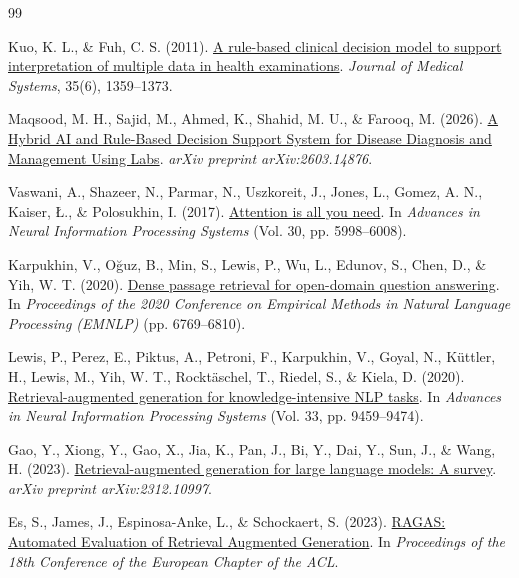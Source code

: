 \cleardoublepage
{}
{}

\begin{thebibliography}{99}

Kuo, K. L., \& Fuh, C. S. (2011).
\href{https://www.csie.ntu.edu.tw/~fuh/personal/ARuleBasedClinicalDecisionModeltoSupport.pdf}{A rule-based clinical decision model to support interpretation of multiple data in health examinations}.
\textit{Journal of Medical Systems}, 35(6), 1359--1373.

Maqsood, M. H., Sajid, M., Ahmed, K., Shahid, M. U., \& Farooq, M. (2026).
\href{https://arxiv.org/abs/2603.14876}{A Hybrid AI and Rule-Based Decision Support System for Disease Diagnosis and Management Using Labs}.
\textit{arXiv preprint arXiv:2603.14876}.

Vaswani, A., Shazeer, N., Parmar, N., Uszkoreit, J., Jones, L., Gomez, A. N., Kaiser, Ł., \& Polosukhin, I. (2017).
\href{https://arxiv.org/abs/1706.03762}{Attention is all you need}.
In \textit{Advances in Neural Information Processing Systems} (Vol. 30, pp. 5998--6008).

Karpukhin, V., Oğuz, B., Min, S., Lewis, P., Wu, L., Edunov, S., Chen, D., \& Yih, W. T. (2020).
\href{https://arxiv.org/abs/2004.04906}{Dense passage retrieval for open-domain question answering}.
In \textit{Proceedings of the 2020 Conference on Empirical Methods in Natural Language Processing (EMNLP)} (pp. 6769--6810).

Lewis, P., Perez, E., Piktus, A., Petroni, F., Karpukhin, V., Goyal, N., Küttler, H., Lewis, M., Yih, W. T., Rocktäschel, T., Riedel, S., \& Kiela, D. (2020).
\href{https://arxiv.org/abs/2005.11401}{Retrieval-augmented generation for knowledge-intensive NLP tasks}.
In \textit{Advances in Neural Information Processing Systems} (Vol. 33, pp. 9459--9474).

Gao, Y., Xiong, Y., Gao, X., Jia, K., Pan, J., Bi, Y., Dai, Y., Sun, J., \& Wang, H. (2023).
\href{https://arxiv.org/abs/2312.10997}{Retrieval-augmented generation for large language models: A survey}.
\textit{arXiv preprint arXiv:2312.10997}.

Es, S., James, J., Espinosa-Anke, L., \& Schockaert, S. (2023).
\href{https://arxiv.org/abs/2309.15217}{RAGAS: Automated Evaluation of Retrieval Augmented Generation}.
In \textit{Proceedings of the 18th Conference of the European Chapter of the ACL}.


\end{thebibliography}
